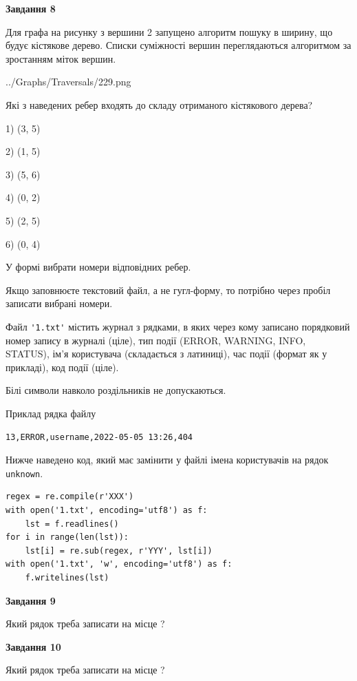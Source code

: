 \documentclass[12pt, ukrainian]{article}
\def\code#1{\Verb!#1!}
\begin{document}
{\begin {large}
{\begin {center}\textbf{Завдання 8}\end {center}}\par
Для графа на рисунку з вершини 2 запущено алгоритм пошуку в ширину, що будує кістякове дерево. Списки суміжності вершин переглядаються алгоритмом за зростанням міток вершин.\par
\begin{center}
	{../Graphs/Traversals/229.png}
\end{center}
\par Які з наведених ребер входять до складу отриманого кістякового дерева?\par
1) (3, 5)\par
2) (1, 5)\par
3) (5, 6)\par
4) (0, 2)\par
5) (2, 5)\par
6) (0, 4)\par
{\vskip 15pt} У формі вибрати номери відповідних ребер.


Якщо заповнюєте текстовий файл, а не гугл-форму, то потрібно через пробіл записа\-ти вибрані номери.\par
\newpage


Файл \code{'1.txt'} містить журнал з рядками, в яких через кому записано поряд\-ко\-вий номер запису в журналі (ціле), тип події (ERROR, WARNING, INFO, STATUS), ім'я користувача (складається з латиниці), час події (фор\-мат як у прикладі), код події (ціле).

Білі символи навколо роздільників не допускаються.

Приклад рядка файлу



\begin{verbatim}
13,ERROR,username,2022-05-05 13:26,404
\end{verbatim}


Нижче наведено код, який має замінити у файлі імена користувачів на рядок \code{unknown}.



\begin{verbatim}
regex = re.compile(r'XXX')
with open('1.txt', encoding='utf8') as f:
    lst = f.readlines()
for i in range(len(lst)):
    lst[i] = re.sub(regex, r'YYY', lst[i])
with open('1.txt', 'w', encoding='utf8') as f:
    f.writelines(lst)
\end{verbatim}




{\begin {center}\textbf{Завдання 9}\end {center}}\par
Який рядок треба записати на місце  ?\par
\vspace{5mm}


{\begin {center}\textbf{Завдання 10}\end {center}}\par
Який рядок треба записати на місце  ?\par


\newpage


\end {large}}
\end{document}
